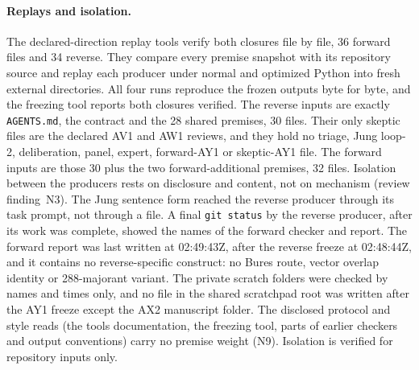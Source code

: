 \paragraph{Replays and isolation.}
The declared-direction replay tools verify both closures file by file, 36
forward files and 34 reverse. They compare every premise snapshot with its
repository source and replay each producer under normal and optimized Python
into fresh external directories. All four runs reproduce the frozen outputs
byte for byte, and the freezing tool reports both closures verified. The
reverse inputs are exactly \texttt{AGENTS.md}, the contract and the 28 shared
premises, 30 files. Their only skeptic files are the declared AV1 and AW1
reviews, and they hold no triage, Jung loop-2, deliberation, panel, expert,
forward-AY1 or skeptic-AY1 file. The forward inputs are those 30 plus the two
forward-additional premises, 32 files. Isolation between the producers rests
on disclosure and content, not on mechanism (review finding~N3). The Jung
sentence form reached the reverse producer through its task prompt, not
through a file. A final \texttt{git status} by the reverse producer, after
its work was complete, showed the names of the forward checker and report.
The forward report was last written at 02:49:43Z, after the reverse freeze at
02:48:44Z, and it contains no reverse-specific construct: no Bures route,
vector overlap identity or 288-majorant variant. The private scratch folders
were checked by names and times only, and no file in the shared scratchpad
root was written after the AY1 freeze except the AX2 manuscript folder. The
disclosed protocol and style reads (the tools documentation, the freezing
tool, parts of earlier checkers and output conventions) carry no premise
weight (N9). Isolation is verified for repository inputs only.

